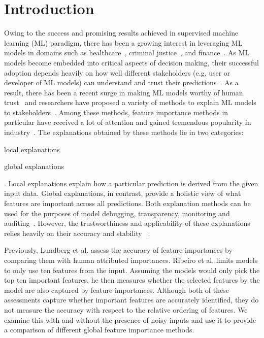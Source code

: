 \vspace{-.5cm}
\section{Introduction} \label{sec:intro}
\vspace{-.2cm}
Owing to the success and promising results achieved in supervised machine learning (ML) paradigm, there has been a growing interest in leveraging ML models in domains such as healthcare~\cite{asgarian2018hybrid,spann2020applying,yasodhara2021identifying}, criminal justice~\cite{rudin2019stop}, and finance~\cite{dixon2020machine}. As ML models become embedded into critical aspects of decision making, their successful adoption depends heavily on how well different stakeholders (e.g. user or developer of ML models) can understand and trust their predictions~\cite{asgarian2019limitations,christodoulakis2017barriers,doshi2017towards,lipton2018mythos,selbst2018intuitive}. As a result, there has been a recent surge in making ML models worthy of human trust~\cite{wiens2019no} and researchers have proposed a variety of methods to explain ML models to stakeholders~\cite{bhatt2020explainable}. 
Among these methods, feature importance methods in particular have received a lot of attention and gained tremendous popularity in industry~\cite{bhatt2020explainable}. The explanations obtained by these methods lie in two categories: \begin{enumerate*} \item local explanations \item global explanations \end{enumerate*}. Local explanations explain how a particular prediction is derived from the given input data. %
Global explanations, in contrast, provide a holistic view of what features are important across all predictions. %
Both explanation methods can be used for the purposes of model debugging, transparency, monitoring and auditing~\cite{bhatt2020explainable}. However, the trustworthiness and applicability of these explanations relies heavily on their accuracy and stability ~\cite{hancox2020robustness}.

Previously, Lundberg et al. \cite{NIPS2017_7062} assess the accuracy of feature importances by comparing them with human attributed importances. Ribeiro et al. \cite{ribeiro2016should} limits models to only use ten features from the input. Assuming the models would only pick the top ten important features, he then measures whether the selected features by the model are also captured by feature importances. Although both of these assessments capture whether important features are accurately identified, they do not measure the accuracy with respect to the relative ordering of features. We examine this with and without the presence of noisy inputs and use it to provide a comparison of different global feature importance methods.


